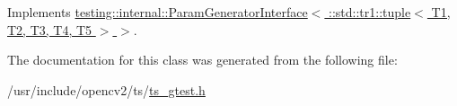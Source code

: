 Implements \hyperlink{classtesting_1_1internal_1_1ParamGeneratorInterface_ae82e6fc79efcef1c794ad333ffb5bf80}{testing\-::internal\-::\-Param\-Generator\-Interface$<$ \-::std\-::tr1\-::tuple$<$ T1, T2, T3, T4, T5 $>$ $>$}.



The documentation for this class was generated from the following file\-:\begin{DoxyCompactItemize}
\item 
/usr/include/opencv2/ts/\hyperlink{ts__gtest_8h}{ts\-\_\-gtest.\-h}\end{DoxyCompactItemize}

